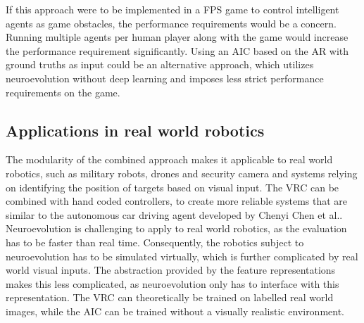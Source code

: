 If this approach were to be implemented in a FPS game to control intelligent agents as game obstacles, the performance requirements would be a concern. Running multiple agents per human player along with the game would increase the performance requirement significantly. Using an AIC based on the AR with ground truths as input could be an alternative approach, which utilizes neuroevolution without deep learning and imposes less strict performance requirements on the game.

\subsection{Applications in real world robotics}
The modularity of the combined approach makes it applicable to real world robotics, such as military robots, drones and security camera and systems relying on identifying the position of targets based on visual input. The VRC can be combined with hand coded controllers, to create more reliable systems that are similar to the autonomous car driving agent developed by Chenyi Chen et al.\cite{chen}. Neuroevolution is challenging to apply to real world robotics, as the evaluation has to be faster than real time. Consequently, the robotics subject to neuroevolution has to be simulated virtually, which is further complicated by real world visual inputs. The abstraction provided by the feature representations makes this less complicated, as neuroevolution only has to interface with this representation. The VRC can theoretically be trained on labelled real world images, while the AIC can be trained without a visually realistic environment.